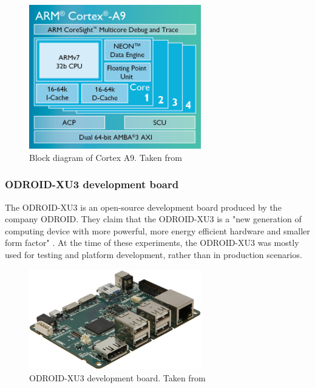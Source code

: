 \begin{figure}[h!]
  \centering
    \includegraphics[width=75mm]{"img/cortexA9"}
    \caption{Block diagram of Cortex A9. Taken from \cite{CORTEXA9}}
    \label{fig:cortexA9}
\end{figure}

\vspace{15mm}

\subsubsection{ODROID-XU3 development board}

The ODROID-XU3 \cite{ODROID_XU3} is an open-source development board produced by
the company ODROID. They claim that the ODROID-XU3 is a "new generation of computing device
with more powerful, more energy efficient hardware and smaller form factor"
\cite{ODROID_XU3}. At the time of these experiments, the ODROID-XU3 was  mostly used for testing and platform development, rather than in production scenarios.


\vspace{15mm}

 \begin{figure}[h!]
  \centering
    \includegraphics[width=75mm]{"img/odroid"}
    \caption{ODROID-XU3 development board. Taken from \cite{ODROID_XU3}}
    \label{fig:odroid}
\end{figure}


\vspace{15mm}

